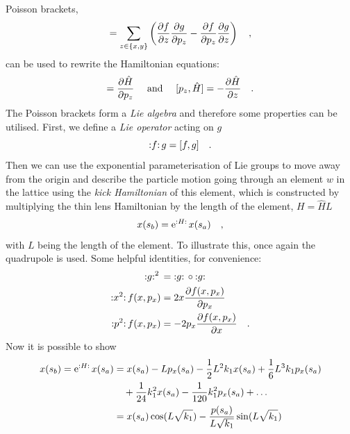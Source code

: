 Poisson brackets,
%
\begin{equation}
    [f,g] = 
    \sum\limits_{z\in\{x,y\}}
    \left(
    \frac{\partial f}{\partial z} \frac{\partial g}{\partial p_z}
    - \frac{\partial f}{\partial p_z}\frac{\partial g}{\partial z}
    \right)
    \komma
\end{equation}
%
can be used to rewrite the Hamiltonian equations:
\begin{align}
    [z, \hat{H}] = \frac{\partial \hat{H}}{\partial p_z}\quad\text{ and }\quad
    [p_z, \hat{H}] = -\frac{\partial \hat{H}}{\partial z}
    \fstop
\end{align}
%
The Poisson brackets form a \emph{Lie algebra} and therefore some properties can be utilised.
First, we define a \emph{Lie operator} acting on $g$
\begin{equation}
    {:}f{:}\,g = [f,g]
    \quad .
\end{equation}
Then we can use the exponential parameterisation of Lie groups to move away from the origin
\cite{Georgi1982} and describe the particle motion going through an element $w$ in the lattice
using the \emph{kick Hamiltonian} of this element,
which is constructed by multiplying the thin lens Hamiltonian by the length of the element,
$H=\hat{H}L$%
%
\begin{equation}
    x(s_b) = \text{e}^{{:}H{:}\,}x(s_a)
    \label{eq_exponential_map}
    \quad ,
\end{equation}
with $L$ being the length of the element.
%
To illustrate this, once again the quadrupole is used. Some helpful identities, for convenience:
\begin{align}
    {:}g{:}^{2}\, &= {:}g{:}\,\circ{:}g{:}\,\notag \\
    {:}x^2{:}\, f(x,p_x) &= 2x\frac{\partial f(x,p_x)}{\partial p_x} \notag \\
    {:}p^2{:}\, f(x,p_x) &= -2p_x\frac{\partial f(x,p_x)}{\partial x}
   \quad .
\end{align}
%
Now it is possible to show
\begin{align}
    x(s_b) = \text{e}^{{:}H{:}\,} x(s_a) &= x(s_a) - Lp_x(s_a)
        - \frac{1}{2}L^2k_1x(s_a) + \frac{1}{6}L^3k_1p_x(s_a)
        \notag \\
        &\quad + \frac{1}{24}k_1^2x(s_a) - \frac{1}{120}k_1^2p_x(s_a)
        + \ldots
        \notag \\
       &= x(s_a) \cos(L\sqrt{k_1}) - \frac{p(s_a)}{L\sqrt{k_1}} \sin(L\sqrt{k_1})
\end{align}
